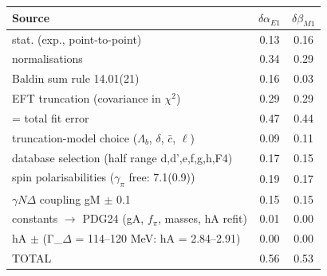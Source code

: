 \begin{tabular}{lcc}
\hline
Source & $\delta\alpha_{E1}$ & $\delta\beta_{M1}$ \\
\hline
stat. (exp., point-to-point) & 0.13 & 0.16 \\
normalisations & 0.34 & 0.29 \\
Baldin sum rule 14.01(21) & 0.16 & 0.03 \\
EFT truncation (covariance in $\chi^2$) & 0.29 & 0.29 \\
= total fit error & 0.47 & 0.44 \\
truncation-model choice ($\Lambda_b$, $\delta$, $\bar c$, $\ell$) & 0.09 & 0.11 \\
database selection (half range d,d',e,f,g,h,F4) & 0.17 & 0.15 \\
spin polarisabilities ($\gamma_\pi$ free: 7.1(0.9)) & 0.19 & 0.17 \\
$\gamma N\Delta$ coupling gM $\pm$ 0.1 & 0.15 & 0.15 \\
constants $\to$ PDG24 (gA, $f_\pi$, masses, hA refit) & 0.01 & 0.00 \\
hA $\pm$ (Γ\_$\Delta$ = 114–120 MeV: hA = 2.84–2.91) & 0.00 & 0.00 \\
TOTAL & 0.56 & 0.53 \\
\hline
\end{tabular}

